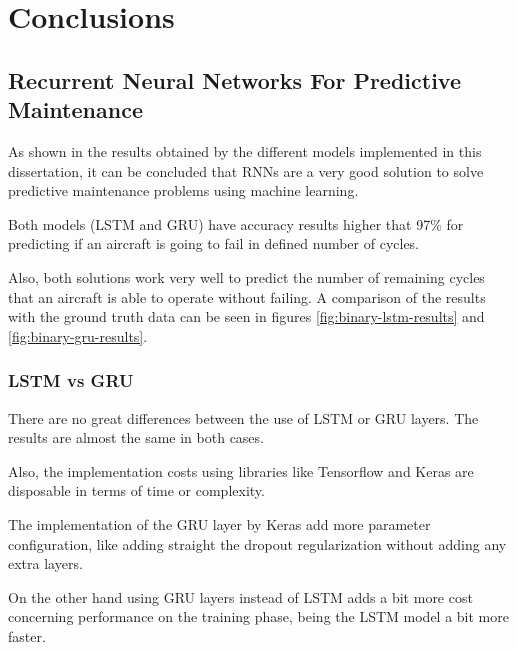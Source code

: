 
\chapter{Conclusions} %

\label{Chapter6} %


\section{Recurrent Neural Networks For Predictive Maintenance}

As shown in the results obtained by the different models implemented in this dissertation, it can be concluded that RNNs are a very good solution to solve predictive maintenance problems using machine learning.

Both models (LSTM and GRU) have accuracy results higher that 97\% for predicting if an aircraft is going to fail in defined number of cycles.

Also, both solutions work very well to predict the number of remaining cycles that an aircraft is able to operate without failing. A comparison of the results with the ground truth data can be seen in figures \ref{fig:binary-lstm-results} and \ref{fig:binary-gru-results}.

\subsection{LSTM vs GRU}

There are no great differences between the use of LSTM or GRU layers.
The results are almost the same in both cases.

Also, the implementation costs using libraries like Tensorflow and Keras are disposable in terms of time or complexity.

The implementation of the GRU layer by Keras add more parameter configuration, like adding straight the dropout regularization without adding any extra layers.

On the other hand using GRU layers instead of LSTM adds a bit more cost concerning performance on the training phase, being the LSTM model a bit more faster.

